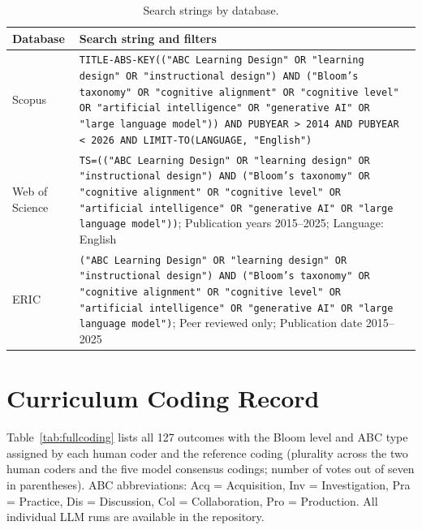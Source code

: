 \documentclass[journal,article,submit,pdftex,moreauthors]{Definitions/mdpi}
\begin{document}
\begin{table}[H]
\caption{Search strings by database.}
\label{tab:searchstrings}
\centering
\scriptsize
\begin{tabularx}{\linewidth}{lX}
\toprule
\textbf{Database} & \textbf{Search string and filters} \\
\midrule
Scopus & \texttt{TITLE-ABS-KEY(("ABC Learning Design" OR "learning design" OR "instructional design") AND ("Bloom's taxonomy" OR "cognitive alignment" OR "cognitive level" OR "artificial intelligence" OR "generative AI" OR "large language model")) AND PUBYEAR > 2014 AND PUBYEAR < 2026 AND LIMIT-TO(LANGUAGE, "English")} \\
\midrule
Web of Science & \texttt{TS=(("ABC Learning Design" OR "learning design" OR "instructional design") AND ("Bloom's taxonomy" OR "cognitive alignment" OR "cognitive level" OR "artificial intelligence" OR "generative AI" OR "large language model"))}; Publication years 2015--2025; Language: English \\
\midrule
ERIC & \texttt{("ABC Learning Design" OR "learning design" OR "instructional design") AND ("Bloom's taxonomy" OR "cognitive alignment" OR "cognitive level" OR "artificial intelligence" OR "generative AI" OR "large language model")}; Peer reviewed only; Publication date 2015--2025 \\
\bottomrule
\end{tabularx}
\end{table}

\section[\appendixname~\thesection]{Curriculum Coding Record}
\label{appendix:coding}

Table~\ref{tab:fullcoding} lists all 127 outcomes with the Bloom level and ABC type assigned by each human coder and the reference coding (plurality across the two human coders and the five model consensus codings; number of votes out of seven in parentheses). ABC abbreviations: Acq = Acquisition, Inv = Investigation, Pra = Practice, Dis = Discussion, Col = Collaboration, Pro = Production. All individual LLM runs are available in the repository.
\end{document}
